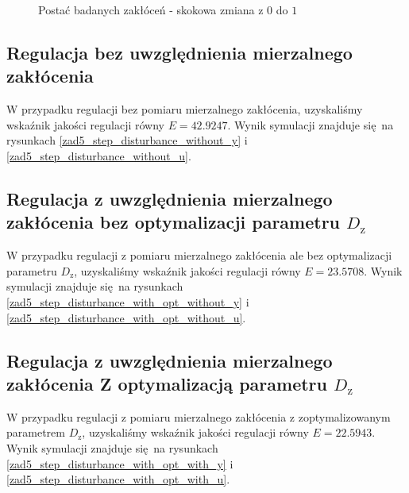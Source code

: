 \begin{figure}[b]
    \centering
    \caption{Postać badanych zakłóceń - skokowa zmiana z $\num{0}$ do $\num{1}$}
    \label{zad5_step_disturbance_z}
\end{figure}
\FloatBarrier


\subsection{Regulacja bez uwzględnienia mierzalnego zakłócenia}
W przypadku regulacji bez pomiaru mierzalnego zakłócenia, uzyskaliśmy wskaźnik jakości regulacji
równy $E = \num{42,9247}$. Wynik symulacji znajduje się na rysunkach \ref{zad5_step_disturbance_without_y}
i \ref{zad5_step_disturbance_without_u}.

\subsection{Regulacja z uwzględnienia mierzalnego zakłócenia bez optymalizacji parametru $D_{\mathrm{z}}$}
W przypadku regulacji z pomiaru mierzalnego zakłócenia ale bez optymalizacji parametru $D_{\mathrm{z}}$, uzyskaliśmy wskaźnik jakości regulacji
równy $E = \num{23,5708}$. Wynik symulacji znajduje się na rysunkach \ref{zad5_step_disturbance_with_opt_without_y}
i \ref{zad5_step_disturbance_with_opt_without_u}.

\subsection{Regulacja z uwzględnienia mierzalnego zakłócenia Z optymalizacją parametru $D_{\mathrm{z}}$}
W przypadku regulacji z pomiaru mierzalnego zakłócenia z zoptymalizowanym parametrem $D_{\mathrm{z}}$, uzyskaliśmy wskaźnik jakości regulacji
równy $E = \num{22,5943}$. Wynik symulacji znajduje się na rysunkach \ref{zad5_step_disturbance_with_opt_with_y}
i \ref{zad5_step_disturbance_with_opt_with_u}.

